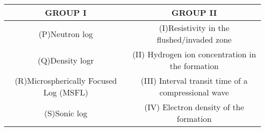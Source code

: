 \begin{tabular}[12pt]{|c|c|}
\hline
\textbf{GROUP I}&\textbf{GROUP II}\\
\hline
(P)Neutron log&(I)Resistivity in the flushed/invaded zone\\
\hline
(Q)Density logr&(II) Hydrogen ion concentration in the formation\\
\hline
(R)Microspherically
Focused Log (MSFL)&(III) Interval transit time of a compressional wave\\
\hline
(S)Sonic log&(IV) Electron density of the formation\\
\hline
\end{tabular}